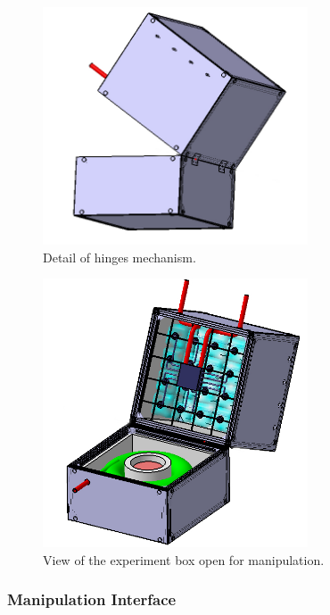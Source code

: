 \begin{figure}[!ht]
    \centering
    \includegraphics[width=0.7\textwidth]{4-experiment-design/img/hinges.jpg}
    \caption{Detail of hinges mechanism.}
    \label{open_box_1}
\end{figure}


\begin{figure}[!ht]
    \centering
    \includegraphics[width=0.7\textwidth]{4-experiment-design/img/open_box.jpg}
    \caption{View of the experiment box open for manipulation.}
    \label{open_box_2}
\end{figure}

\pagebreak
\subsubsection{Manipulation Interface}

